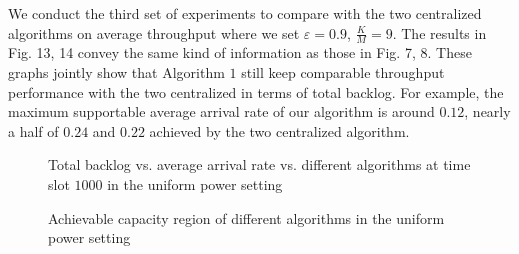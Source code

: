 \documentclass[journal]{IEEEtran}
\begin{document}
We  conduct the third set of experiments to compare with the two centralized algorithms on average throughput where we set $\varepsilon=0.9$, $\frac{K}{M}=9$. The results in Fig. 13, 14  convey the same kind of information as those in Fig. 7, 8. These graphs jointly show that Algorithm $1$ still keep comparable throughput performance with the two centralized in terms of total backlog. For example, the maximum supportable average arrival rate of our algorithm is around $0.12$, nearly a half of $0.24$ and $0.22$ achieved by the two centralized algorithm.

\begin{figure}[htpb]
    \centering
  \hspace{0cm}
     \caption{{\small{Total backlog vs. average arrival rate  vs. different algorithms at time slot $1000$ in the uniform power setting} }}
\end{figure}

\begin{comment}
\begin{figure*}[htpb]
    \centering
    \subfigure[Average arrival rate = $0.16$ ]{
        \texttt{[image: up-rate16.eps]}}
  \hspace{0cm}
\subfigure[Average arrival rate = $0.26$]{
        \texttt{[image: up-rate26.eps]}}
  \hspace{0cm}
\subfigure[Average arrival rate =$ 0.32$]{
        \texttt{[image: up-rate32.eps]}}
   \caption{{\small{Total backlog vs. time slot vs. different algorithms at different average arrival rate in the uniform power setting }}}
   \vspace*{-1\baselineskip}
\end{figure*}
\end{comment}
\begin{figure*}[htpb]
    \centering
  \hspace{0cm}
  \hspace{0cm}
   \caption{{\small{Achievable capacity region of different algorithms in the uniform power setting}}}
   \vspace*{-1.0\baselineskip}
\end{figure*}
\end{document}
